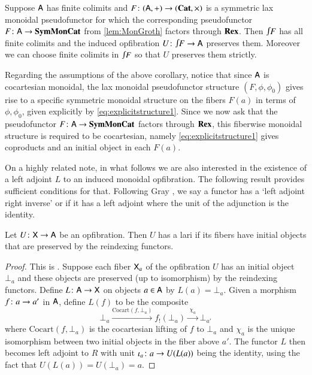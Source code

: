 \documentclass[reqno]{amsart}
\begin{document}
\begin{cor}\label{cor:fcocMonGroth}
 Suppose $\mathsf{A}$ has finite colimits and $F \colon (\mathsf{A},+) \to (\mathbf{Cat},\times)$ is a symmetric lax monoidal pseudofunctor for which the corresponding pseudofunctor $F  \colon \mathsf{A} \to \mathbf{SymMonCat}$ from \cref{lem:MonGroth} factors through $\mathbf{Rex}$.  Then $\inta F$ has all finite colimits and  the induced opfibration $U\maps \inta F \to \A$ preserves them.  Moreover we can choose finite colimits in $\inta F$ so that $U$ preserves them strictly.
\end{cor}

Regarding the assumptions of the above corollary, notice that since $\mathsf{A}$ is cocartesian monoidal, the lax monoidal pseudofunc\-tor structure $(F,\phi,\phi_0)$ gives rise to a specific symmetric monoidal structure on the fibers $F(a)$ in terms of $\phi,\phi_0$, given explicitly by \cref{eq:explicitstructure1}. Since we now ask that the pseudofunctor $F\colon \mathsf{A}\to\mathbf{SymMonCat}$ factors through $\mathbf{Rex}$, this fiberwise monoidal structure is required to be cocartesian, namely \cref{eq:explicitstructure1} gives coproducts and an initial object in each $F(a)$.

On a highly related note, in what follows we are also interested in the existence of a left adjoint $L$ to an induced monoidal opfibration.  The following result provides sufficient conditions for that.  Following Gray \cite{Gray}, we say a functor has a `left adjoint right inverse' or  if it has a left adjoint where the unit of the adjunction is the identity.

\begin{lem} \label{prop:opfibtolari}
Let $U \colon\mathsf{X} \to \mathsf{A}$ be an opfibration.   Then $U$ has a lari if its fibers have initial objects
that are preserved by the reindexing functors.
\end{lem}

\begin{proof}
 This is \cite[Proposition~4.4]{Gray}.    Suppose each fiber $\mathsf{X}_a$ of the opfibration $U$ has an initial object $\bot_a$ and these objects are preserved (up to isomorphism) by the reindexing functors.   Define $L \colon \mathsf{A} \to \mathsf{X}$ on objects $a \in \mathsf{A}$ by $L(a) = \bot_a$.   Given a morphism $f\colon a\to a'$ in $\mathsf{A}$, define $L(f)$ to be the composite
 \begin{equation}\label{eq:Lonarrows}
  \bot_a\xrightarrow{\mathrm{Cocart}(f,\bot_a)}f_!(\bot_a)\xrightarrow{\;\chi_a\;}\bot_{a'}
 \end{equation}
where $\mathrm{Cocart}(f,\bot_a)$ is the cocartesian lifting of $f$ to $\bot_a$ and $\chi_a$ is the unique isomorphism between two initial objects in the fiber above $a'$.    The functor $L$ then becomes left adjoint to $R$ with unit $\iota_a \colon a \to U(L(a))$ being the identity, using the fact that $U(L(a)) = U(\bot_a) = a$.
\end{proof}
\end{document}
